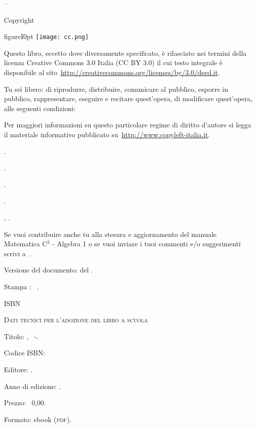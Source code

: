 \thispagestyle{empty}
{\setlength{\parindent}{0em}\small{
\begin{center}
{\large{\serie – \titolo}}

Copyright {\textcopyright} {\anno} \editore
\end{center}

\begin{wrapfloat}{figure}{I}{0pt}
\texttt{[image: cc.png]}
\end{wrapfloat}

Questo libro, eccetto dove diversamente specificato, è rilasciato nei termini 
della licenza Creative Commons 3.0 Italia
(CC BY 3.0) il cui testo integrale è disponibile al 
sito~\url{http://creativecommons.org/licenses/by/3.0/deed.it}.

Tu sei libero:
di riprodurre, distribuire, comunicare al pubblico, esporre in pubblico, rappresentare,
eseguire e recitare quest'opera, di modificare quest'opera, alle seguenti condizioni:

 Per maggiori informazioni su questo particolare regime di diritto d'autore si
legga il materiale informativo pubblicato su~\url{http://www.copyleft-italia.it}.

 \coord .

 \autori.

 \colab.

 {\texautori}.

 {\texcol, \texautori}.

 Se vuoi contribuire anche tu alla stesura e aggiornamento
del manuale Matematica C$^3$ - Algebra 1 o se vuoi inviare i tuoi commenti e/o suggerimenti scrivi
a~.

\vspace{2ex}
 Versione del documento: {\docvers} del {\oggi}.

 Stampa \edizione : \mese\ \anno.

 ISBN \mcisbn

\vspace{2ex}
 {\scshape{Dati tecnici per l'adozione del libro a scuola}}

 Titolo: \serie, \titolo\ -\edizione.

 Codice ISBN: \mcisbn

 Editore: \href{http://www.matematicamente.it}{\editore}.

 Anno di edizione: \anno.

 Prezzo: \officialeuro\ 0,00.

 Formato: ebook (\scshape{pdf}).
}}
\cleardoublepage
